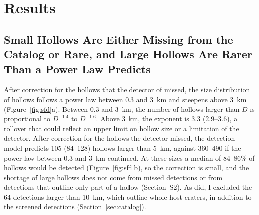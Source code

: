 \documentclass[article,review]{planetary}
\begin{document}
\FloatBarrier
\section{Results}
\label{sec:results}

\subsection{Small Hollows Are Either Missing from the Catalog or Rare, and Large Hollows Are Rarer Than a Power Law Predicts}
\label{sec:sfd}
After correction for the hollows that the detector of \textcite{bickel2025} missed, the size distribution of hollows follows a power law between 0.3 and 3~km and steepens above 3~km (Figure~\ref{fig:sfd}a). Between 0.3 and 3~km, the number of hollows larger than $D$ is proportional to $D^{-1.4}$ to $D^{-1.6}$. Above 3~km, the exponent is 3.3 (2.9--3.6), a rollover that could reflect an upper limit on hollow size or a limitation of the detector. After correction for the hollows the detector missed, the detection model predicts 105 (84--128) hollows larger than 5~km, against 360--490 if the power law between 0.3 and 3~km continued. At these sizes a median of 84--86\% of hollows would be detected (Figure~\ref{fig:sfd}b), so the correction is small, and the shortage of large hollows does not come from missed detections or from detections that outline only part of a hollow (Section~S2). As \textcite{bickel2025} did, I excluded the 64 detections larger than 10~km, which outline whole host craters, in addition to the screened detections (Section~\ref{sec:catalog}).
\end{document}
